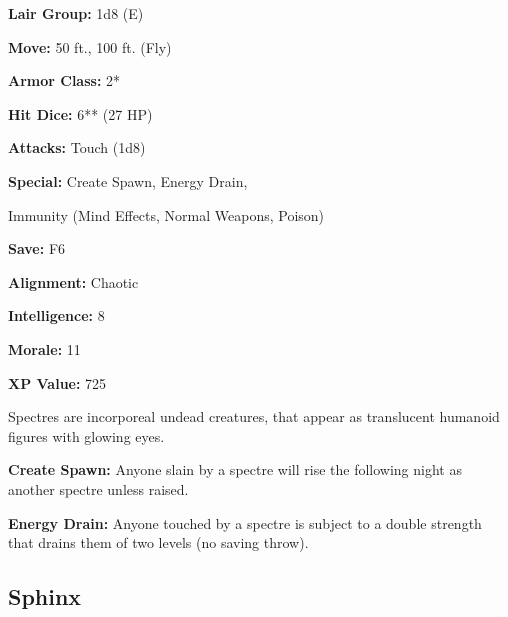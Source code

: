 \begin{multicols*}{2}
{\textbf{Lair Group:} 1d8 (E)

\textbf{Move:} 50 ft., 100 ft. (Fly)

\textbf{Armor Class:} 2*

\textbf{Hit Dice:} 6** (27 HP)

\textbf{Attacks:} Touch (1d8)

\textbf{Special:} Create Spawn, Energy Drain, 

Immunity (Mind Effects, Normal Weapons, Poison)

\textbf{Save:} F6

\textbf{Alignment:} Chaotic

\textbf{Intelligence:} 8

\textbf{Morale:} 11

\textbf{XP Value:} 725}

Spectres are incorporeal undead creatures, that appear as translucent humanoid figures with glowing eyes.

\textbf{Create Spawn:} Anyone slain by a spectre will rise the following night as another spectre unless raised.

\textbf{Energy Drain:} Anyone touched by a spectre is subject to a double strength  that drains them of two levels (no saving throw).

\subsection{Sphinx}
\end{multicols*}
